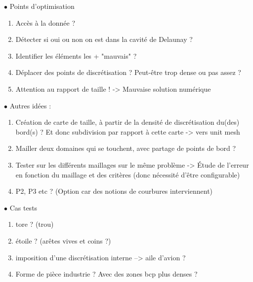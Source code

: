 \documentclass[11pt]{article}
\def \vn {\vspace{3 mm} \noindent}
\begin{document}
\vn
$\bullet$ Points d'optimisation

\begin{enumerate}
	\item Accès à la donnée ?
	\item Détecter si oui ou non on est dans la cavité de Delaunay ?
	\item Identifier les éléments les + "mauvais" ?
	\item Déplacer des points de discrétisation ? Peut-être trop dense ou pas assez ?
	\item Attention au rapport de taille ! -> Mauvaise solution numérique
\end{enumerate}

\vn	
$\bullet$ Autres idées : 

\begin{enumerate}
	\item Création de carte de taille, à partir de la densité de discrétisation du(des) bord(s) ? Et donc subdivision par rapport à cette carte -> vers unit mesh
	\item Mailler deux domaines qui se touchent, avec partage de points de bord ?
	\item Tester sur les différents maillages sur le même problème -> Étude de l'erreur en fonction du maillage et des critères (donc nécessité d'être configurable)
	\item P2, P3 etc ? (Option car des notions de courbures interviennent)
\end{enumerate}

\vn
$\bullet$ Cas tests

\begin{enumerate}
	\item tore ? (trou)	
	\item étoile ? (arêtes vives et coins ?)
	\item imposition d'une discrétisation interne --> aile d'avion ?
	\item Forme de pièce industrie ? Avec des zones bcp plus denses ?
\end{enumerate}



\end{document}
